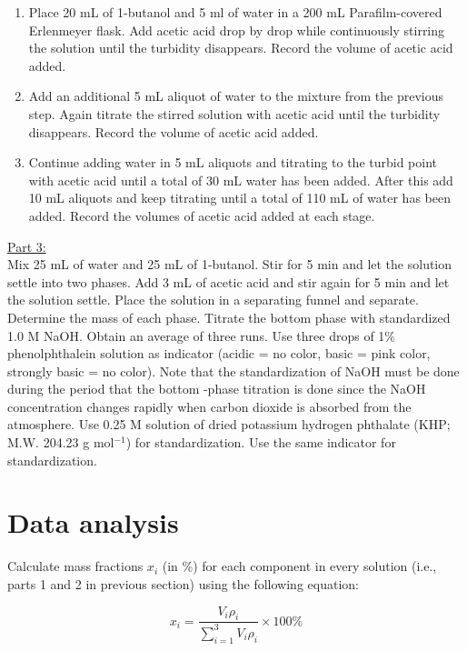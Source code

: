 \documentclass[byrevtex,amssymb,aps,pra,floatfix,letterpaper]{revtex4}
\begin{document}
\begin{enumerate}
\item Place 20 mL of 1-butanol and 5 ml of water in a 200 mL Parafilm-covered Erlenmeyer flask. Add acetic acid drop by drop while continuously stirring the solution until the turbidity disappears. Record the volume of acetic acid added.

\item Add an additional 5 mL aliquot of water to the mixture from the previous step. Again titrate the stirred solution with acetic acid until the turbidity disappears. Record the volume of acetic acid added.

\item Continue adding water in 5 mL aliquots and titrating to the turbid point with acetic acid until a total of 30 mL water has been added. After this add 10 mL aliquots and keep titrating until a total of 110 mL of water has been added. Record the volumes of acetic acid added at each stage.

\end{enumerate}

\noindent
\underline{Part 3:}\\

\noindent
Mix 25 mL of water and 25 mL of 1-butanol. Stir for 5 min and let the solution settle into two phases. Add 3 mL of acetic acid and stir again for 5 min and let the solution settle. Place the solution in a separating funnel and separate. Determine the mass of each phase. Titrate the bottom phase with standardized 1.0 M NaOH. Obtain an average of three runs. Use three drops of 1\% phenolphthalein solution as indicator (acidic = no color, basic = pink color, strongly basic = no color). Note that the standardization of NaOH must be done during the period that the bottom -phase titration is done since the NaOH concentration changes rapidly when carbon dioxide is absorbed from the atmosphere. Use 0.25 M solution of dried potassium hydrogen phthalate (KHP; M.W. 204.23 g mol$^{-1}$) for standardization. Use the same indicator for standardization.

\section{Data analysis}

Calculate mass fractions $x_i$ (in \%) for each component in every solution (i.e., parts 1 and 2 in previous section) using the following equation:

\begin{equation}
x_i = \frac{V_i\rho_i}{\sum\limits_{i=1}^3V_i\rho_i}\times 100\%
\label{eq2}
\end{equation}
\end{document}
